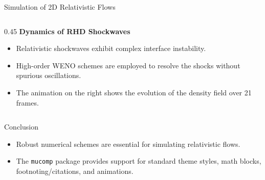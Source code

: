 \documentclass[aspectratio=169]{beamer}
\begin{document}
\begin{frame}{Simulation of 2D Relativistic Flows}
  \begin{columns}
    \begin{column}{0.45\textwidth}
      \textbf{Dynamics of RHD Shockwaves}
      \begin{itemize}
        \item Relativistic shockwaves exhibit complex interface instability.
        \item High-order WENO schemes are employed to resolve the shocks without spurious oscillations.
        \item The animation on the right shows the evolution of the density field over 21 frames.
      \end{itemize}
    \end{column}
  \end{columns}
\end{frame}

\begin{frame}{Conclusion}
  \begin{itemize}
    \item Robust numerical schemes are essential for simulating relativistic flows.
    \item The \texttt{mucomp} package provides support for standard theme styles, math blocks, footnoting/citations, and animations.
  \end{itemize}
\end{frame}
\end{document}
